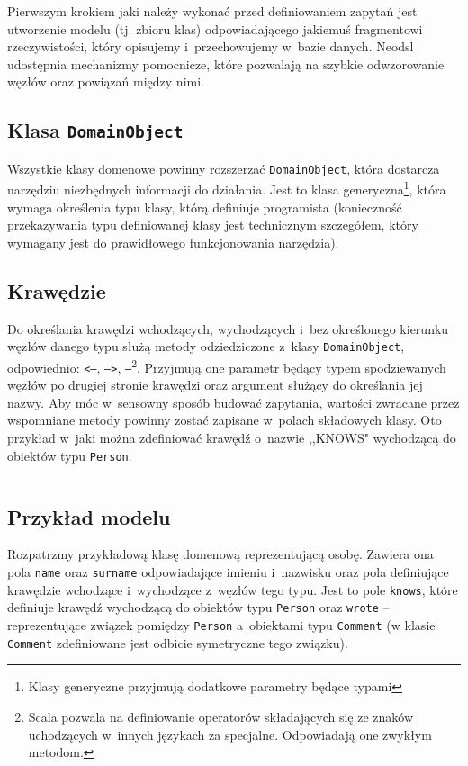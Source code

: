 \documentclass[brudnopis]{xmgr}
\begin{document}
Pierwszym krokiem jaki należy wykonać przed definiowaniem zapytań jest utworzenie modelu (tj. zbioru klas) odpowiadającego jakiemuś fragmentowi rzeczywistości, który opisujemy i~przechowujemy w~bazie danych. Neodsl udostępnia mechanizmy pomocnicze, które pozwalają na szybkie odwzorowanie węzłów oraz powiązań między nimi.

\subsection{Klasa \texttt{DomainObject}}

Wszystkie klasy domenowe powinny rozszerzać \texttt{DomainObject}, która dostarcza narzędziu niezbędnych informacji do działania. Jest to klasa generyczna\footnote{Klasy generyczne  przyjmują dodatkowe parametry będące typami}, która wymaga określenia typu klasy, którą definiuje programista (konieczność przekazywania typu definiowanej klasy jest technicznym szczegółem, który wymagany jest do prawidłowego funkcjonowania narzędzia). 

\subsection{Krawędzie}

Do określania krawędzi wchodzących, wychodzących i~bez określonego kierunku węzłów danego typu służą metody odziedziczone z~klasy \texttt{DomainObject}, odpowiednio:  \texttt{<--}, \texttt{-->}, \texttt{--}\footnote{Scala pozwala na definiowanie operatorów składających się ze znaków uchodzących w~innych językach za specjalne. Odpowiadają one zwykłym metodom.}. Przyjmują one parametr będący typem spodziewanych węzłów po drugiej stronie krawędzi oraz argument służący do określania jej nazwy. Aby móc w~sensowny sposób budować zapytania, wartości zwracane przez wspomniane metody powinny zostać zapisane w~polach składowych klasy. Oto przykład w~jaki można zdefiniować krawędź o~nazwie ,,KNOWS" wychodzącą do obiektów typu \texttt{Person}.

\inputminted{scala}{listings/scala/dsl/simple-relation.scala}

\subsection{Przykład modelu}

Rozpatrzmy przykładową klasę domenową reprezentującą osobę. Zawiera ona pola \texttt{name} oraz \texttt{surname} odpowiadające imieniu i~nazwisku oraz pola definiujące krawędzie wchodzące i~wychodzące z~węzłów tego typu. Jest to pole \texttt{knows}, które definiuje krawędź wychodzącą do obiektów typu \texttt{Person} oraz \texttt{wrote} -- reprezentujące związek pomiędzy \texttt{Person} a~obiektami typu \texttt{Comment} (w klasie \texttt{Comment} zdefiniowane jest odbicie symetryczne tego związku).
\end{document}
